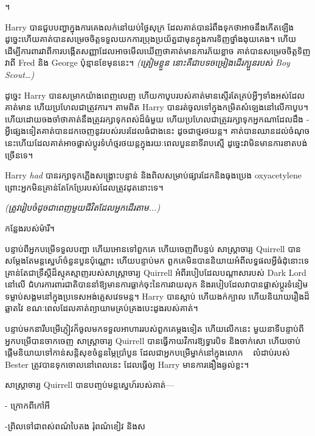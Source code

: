 
។

\hplettrineextrapara
Harry បានជួបបញ្ហាក្នុងការគេងលក់នៅយប់ថ្ងៃសុក្រ ដែលគាត់បានរំពឹងទុកថាអាចនឹងកើតឡើង ដូច្នេះហើយគាត់បានសម្រេចចិត្តទទួលយកការប្រុងប្រយ័ត្នជាមុនក្នុងការទិញថ្នាំងងុយគេង។ ហើយ​ដើម្បី​ការពារ​វា​ពី​ការ​បង្កើត​សញ្ញា​ដែល​អាច​មើល​ឃើញ​ថា​គាត់​មាន​ការ​ភ័យ​ខ្លាច គាត់​បាន​សម្រេច​ចិត្ត​ទិញ​វា​ពី Fred និង George ប៉ុន្មាន​ខែ​មុន​នេះ។ \emph{(ត្រៀមខ្លួន នោះគឺជាបទចម្រៀងដើរក្បួនរបស់ Boy Scout…)}

ដូច្នេះ Harry បានសម្រាកយ៉ាងពេញលេញ ហើយកាបូបរបស់គាត់មានស្ទើរតែគ្រប់អ្វីៗទាំងអស់ដែលគាត់មាន ហើយប្រហែលជាត្រូវការ។ តាមពិត Harry បានរត់ចូលទៅក្នុងកម្រិតសំឡេងនៅលើកាបូប។ ហើយដោយចងចាំថាគាត់នឹងត្រូវរក្សាទុកពស់ដ៏ធំមួយ ហើយប្រហែលជាត្រូវរក្សាទុកអ្នកណាដែលដឹង - អ្វីផ្សេងទៀតគាត់បានដកចេញនូវរបស់របរដែលធំជាងនេះ ដូចជាថ្មរថយន្ត។ គាត់​បាន​ឈាន​ដល់​ចំណុច​នេះ​ហើយ​ដែល​គាត់​អាច​ផ្លាស់ប្តូរ​ទំហំ​ថ្ម​រថយន្ត​ក្នុង​រយៈពេល​បួន​នាទី​រាបស្មើ ដូច្នេះ​វា​មិន​មាន​ការ​ខាតបង់​ច្រើន​ទេ។

Harry \emph{had} បាន​រក្សា​ទុក​ភ្លើង​សង្គ្រោះ​បន្ទាន់ និង​ពិល​សម្រាប់​ផ្សារ​ដែក​និង​ធុង​ប្រេង oxyacetylene ព្រោះ​អ្នក​មិន​គ្រាន់​តែ​កែ​ប្រែ​របស់​ដែល​ត្រូវ​ដុត​នោះ​ទេ។

\emph{(ត្រូវ​រៀបចំ​ដូច​ជា​ពេញ​មួយ​ជីវិត​ដែល​អ្នក​ដើរ​តាម...)}

កន្លែងរបស់ម៉ារី។

បន្ទាប់ពីអ្នកបម្រើទទួលបញ្ជា ហើយអោនទៅពួកគេ ហើយចេញពីបន្ទប់ សាស្រ្តាចារ្យ Quirrell បានសម្តែងតែមន្តស្នេហ៍ចំនួនបួនប៉ុណ្ណោះ ហើយបន្ទាប់មក ពួកគេមិនបាននិយាយអំពីលទ្ធផលអ្វីធំដុំនោះទេ គ្រាន់តែជាទ្រឹស្ដីដ៏ស្មុគស្មាញរបស់សាស្រ្តាចារ្យ Quirrell អំពីរបៀបដែលបណ្តាសារបស់ Dark Lord នៅលើ ជំហរការពារជាតិបាននាំឱ្យមានការធ្លាក់ចុះនៃការវាយលុក និងរបៀបដែលវាបានផ្លាស់ប្តូរទំនៀមទម្លាប់សង្គមនៅក្នុងប្រទេសអង់គ្លេសវេទមន្ត។ Harry បានស្តាប់ ហើយងក់ក្បាល ហើយនិយាយរឿងដ៏ឆ្លាតវៃ ខណៈពេលដែលគាត់ព្យាយាមគ្រប់គ្រងបេះដូងរបស់គាត់។

បន្ទាប់មកនារីបម្រើភ្ញៀវក៏ចូលមកទទួលអាហាររបស់ពួកគេម្តងទៀត ហើយលើកនេះ មួយនាទីបន្ទាប់ពីអ្នកបម្រើបានចាកចេញ សាស្ត្រាចារ្យ Quirrell បានធ្វើកាយវិការឱ្យទ្វារបិទ និងចាក់សោ ហើយចាប់ផ្តើមនិយាយទៅកាន់សន្តិសុខចំនួនម្ភៃប្រាំបួន ដែលជាអ្នកបម្រើម្នាក់នៅក្នុងលោក ~ លំដាប់របស់ Bester ត្រូវបានទុកចោលនៅពេលនេះ ដែលធ្វើឲ្យ Harry មានការងឿងឆ្ងល់ខ្លះ។

សាស្រ្តាចារ្យ Quirrell បានបញ្ចប់មន្តស្នេហ៍របស់គាត់—

- ក្រោកពីកៅអី

-ព្រិលទៅជាពស់ពណ៌បៃតង រុំពណ៌ខៀវ និងស

